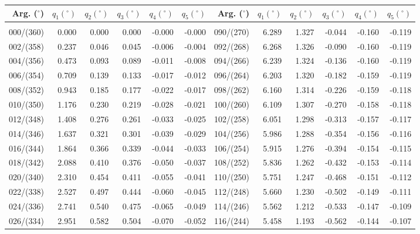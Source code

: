 \newpage
\begin{table}\centering
\small{ \begin{tabular}{rrrrrr|rrrrrr}
Arg. ($^\circ$) & $q_1(^\circ)$  & $q_2(^\circ)$ & $q_3(^\circ)$ & $q_4(^\circ)$  & $q_5(^\circ)$ &
Arg. ($^\circ$) & $q_1(^\circ)$  & $q_2(^\circ)$ & $q_3(^\circ)$ & $q_4(^\circ)$  & $q_5(^\circ)$  \\\hline
&&&&&&&&&&&\\[-1.75ex]
000/(360) &  0.000 &  0.000 &  0.000 & -0.000 & -0.000 & 090/(270) &  6.289 &  1.327 & -0.044 & -0.160 & -0.119\\
002/(358) &  0.237 &  0.046 &  0.045 & -0.006 & -0.004 & 092/(268) &  6.268 &  1.326 & -0.090 & -0.160 & -0.119\\
004/(356) &  0.473 &  0.093 &  0.089 & -0.011 & -0.008 & 094/(266) &  6.239 &  1.324 & -0.136 & -0.160 & -0.119\\
006/(354) &  0.709 &  0.139 &  0.133 & -0.017 & -0.012 & 096/(264) &  6.203 &  1.320 & -0.182 & -0.159 & -0.119\\
008/(352) &  0.943 &  0.185 &  0.177 & -0.022 & -0.017 & 098/(262) &  6.160 &  1.314 & -0.226 & -0.159 & -0.118\\
010/(350) &  1.176 &  0.230 &  0.219 & -0.028 & -0.021 & 100/(260) &  6.109 &  1.307 & -0.270 & -0.158 & -0.118\\
012/(348) &  1.408 &  0.276 &  0.261 & -0.033 & -0.025 & 102/(258) &  6.051 &  1.298 & -0.313 & -0.157 & -0.117\\
014/(346) &  1.637 &  0.321 &  0.301 & -0.039 & -0.029 & 104/(256) &  5.986 &  1.288 & -0.354 & -0.156 & -0.116\\
016/(344) &  1.864 &  0.366 &  0.339 & -0.044 & -0.033 & 106/(254) &  5.915 &  1.276 & -0.394 & -0.154 & -0.115\\
018/(342) &  2.088 &  0.410 &  0.376 & -0.050 & -0.037 & 108/(252) &  5.836 &  1.262 & -0.432 & -0.153 & -0.114\\
020/(340) &  2.310 &  0.454 &  0.411 & -0.055 & -0.041 & 110/(250) &  5.751 &  1.247 & -0.468 & -0.151 & -0.112\\
022/(338) &  2.527 &  0.497 &  0.444 & -0.060 & -0.045 & 112/(248) &  5.660 &  1.230 & -0.502 & -0.149 & -0.111\\
024/(336) &  2.741 &  0.540 &  0.475 & -0.065 & -0.049 & 114/(246) &  5.562 &  1.212 & -0.533 & -0.147 & -0.109\\
026/(334) &  2.951 &  0.582 &  0.504 & -0.070 & -0.052 & 116/(244) &  5.458 &  1.193 & -0.562 & -0.144 & -0.107\\

\end{tabular}}
\end{table}
